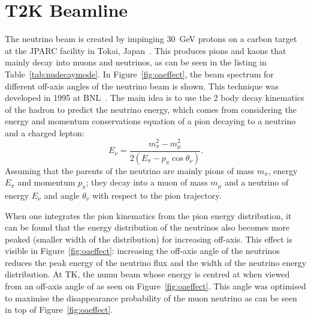 \section{T2K Beamline}
\label{sec:t2kbeamline}
The neutrino beam is created by impinging 30~GeV protons on a carbon
target at the \Gls{JPARC} facility in Tokai,
Japan~\cite{FluxT2K2013}. This produces pions and kaons that mainly
decay into muons and neutrinos, as can be seen in the listing in
Table~\ref{tab:nudecaymode}. In Figure~\ref{fig:oaeffect}, the beam
spectrum for different off-axis angles of the neutrino beam is shown.
This technique was developed in 1995 at BNL~\cite{AGS1993}.  The main
idea is to use the 2 body decay kinematics of the hadron to predict
the neutrino energy, which comes from considering the energy and
momentum conservations equation of a pion decaying to a neutrino and a
charged lepton:
\begin{equation}
  E_\nu = \frac{m_\pi^2 - m_\mu^2}{2(E_\pi - p_\pi\cos\theta_\nu)}.
  \label{eq:offaxis}
\end{equation}
Assuming that the parents of the neutrino are mainly pions of mass
$m_\pi$, energy $E_\pi$ and momentum $p_\pi$; they decay into a muon
of mass $m_\mu$ and a neutrino of energy $E_\nu$ and angle
$\theta_\nu$ with respect to the pion trajectory.

When one integrates the pion kinematics from the pion energy
distribution, it can be found that the energy distribution of the
neutrinos also becomes more peaked (smaller width of the distribution)
for increasing off-axis. This effect is visible in
Figure~\ref{fig:oaeffect}: increasing the off-axis angle of the
neutrinos reduces the peak energy of the neutrino flux and the width
of the neutrino energy distribution. At \Gls{TK}, the \gls{numu} beam
whose energy is centred at \energy when viewed from an off-axis angle
of \offaxis as seen on Figure~\ref{fig:oaeffect}. This angle was
optimised to maximise the disappearance probability of the muon
neutrino as can be seen in top of Figure~\ref{fig:oaeffect}.

